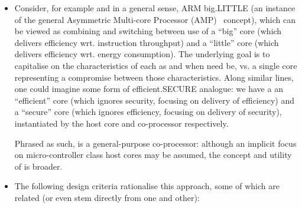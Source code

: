 \begin{itemize}
\item Consider, for example and in a general sense, ARM {\sf big.LITTLE}
      (an instance of the general Asymmetric Multi-core Processor (AMP)~\cite{SCARV:Mittal:16} concept),
      which can be viewed as combining and switching between
      use of
      a ``big''    core (which delivers efficiency wrt. instruction throughput)
      and 
      a ``little'' core (which delivers efficiency wrt. energy consumption).
      The underlying goal is to capitalise on the characteristics of each as 
      and when need be, vs. a single core representing a compromise between 
      those characteristics.  Along similar lines, one could imagine some
      form of {\sf efficient.SECURE} analogue: we have a 
      an ``efficient'' core (which ignores   security, focusing on delivery of efficiency)
      and
      a  ``secure''    core (which ignores efficiency, focusing on delivery of   security),
      instantiated by the host core and \XCID co-processor respectively.

      Phrased as such, \XCID is a general-purpose co-processor: although an
      implicit focus on micro-controller class host cores may be assumed, 
      the concept and utility of \XCID is broader.

\item The following design criteria rationalise this approach, some of which
      are related (or even stem directly from one and other):


\end{itemize}
